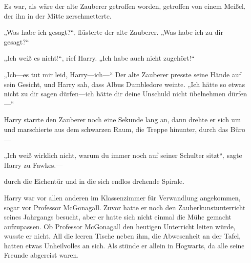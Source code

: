 Es war, als wäre der alte Zauberer getroffen worden, getroffen von einem Meißel, der ihn in der Mitte zerschmetterte.

„Was habe ich gesagt?“, flüsterte der alte Zauberer. „Was habe ich zu dir gesagt?“

„Ich weiß es nicht!“, rief Harry. „Ich habe auch nicht zugehört!“

„Ich—es tut mir leid, Harry—ich—“
Der alte Zauberer presste seine Hände auf sein Gesicht, und Harry sah, dass Albus Dumbledore weinte.
„Ich hätte so etwas nicht zu dir sagen dürfen—ich hätte dir deine Unschuld nicht übelnehmen dürfen—“

Harry starrte den Zauberer noch eine Sekunde lang an, dann drehte er sich um und marschierte aus dem schwarzen Raum, die Treppe hinunter, durch das Büro—

„Ich weiß wirklich nicht, warum du immer noch auf seiner Schulter sitzt“, sagte Harry zu Fawkes.—

durch die Eichentür und in die sich endlos drehende Spirale.

\later

Harry war vor allen anderen im Klassenzimmer für Verwandlung angekommen, sogar vor Professor McGonagall. Zuvor hatte er noch den Zauberkunstunterricht seines Jahrgangs besucht, aber er hatte sich nicht einmal die Mühe gemacht aufzupassen. Ob Professor McGonagall den heutigen Unterricht leiten würde, wusste er nicht.
All die leeren Tische neben ihm, die Abwesenheit an der Tafel, hatten etwas Unheilvolles an sich. Als stünde er allein in Hogwarts, da alle seine Freunde abgereist waren.

